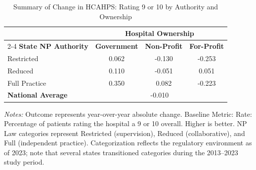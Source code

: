 \begin{table}[htbp]
    \centering
    \caption{Summary of Change in HCAHPS: Rating 9 or 10 by Authority and Ownership}
    \label{tab:d_h_hosp_rating_9_10}
    \vspace{0.2cm}
    \begin{tabular}{lccc}
        \toprule
        & \multicolumn{3}{c}{\textbf{Hospital Ownership}} \\
        \cmidrule(lr){2-4}
        \textbf{State NP Authority} & \textbf{Government} & \textbf{Non-Profit} & \textbf{For-Profit} \\
        \midrule
        Restricted & 0.062 & -0.130 & -0.253 \\
        Reduced & 0.110 & -0.051 & 0.051 \\
        Full Practice & 0.350 & 0.082 & -0.223 \\
        \midrule
        \textbf{National Average} & \multicolumn{3}{c}{-0.010} \\
        \bottomrule
    \end{tabular}
    \vspace{0.1cm}
    \begin{minipage}{0.85\textwidth}
        \footnotesize \textit{Notes:} Outcome represents year-over-year absolute change. Baseline Metric: Rate: Percentage of patients rating the hospital a 9 or 10 overall. Higher is better. NP Law categories represent Restricted (supervision), Reduced (collaborative), and Full (independent practice). Categorization reflects the regulatory environment as of 2023; note that several states transitioned categories during the 2013--2023 study period.
    \end{minipage}
\end{table}